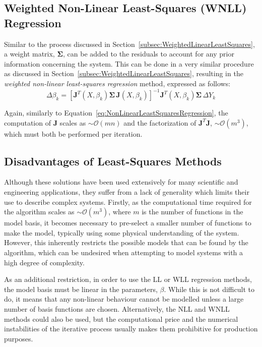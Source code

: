 \documentclass{article}
\begin{document}
\subsection{Weighted Non-Linear Least-Squares (WNLL) Regression}
\label{subsec:WeightedNonLinearLeastSquares}

Similar to the process discussed in Section~\ref{subsec:WeightedLinearLeastSquares}, a weight matrix, $\mathbf{\Sigma}$, can be added to the residuals to account for any prior information concerning the system. This can be done in a very similar procedure as discussed in Section~\ref{subsec:WeightedLinearLeastSquares}, resulting in the \emph{weighted non-linear least-squares regression} method, expressed as follows:
\begin{equation}
\label{eq:WeightedNonLinearLeastSquaresRegression}
	\Delta \beta_k = \left[\mathbf{J}^T\!\left(X,\beta_k\right) \mathbf{\Sigma} \, \mathbf{J}\!\left(X,\beta_k\right)\right]^{-1} \mathbf{J}^T\!\left(X,\beta_k\right) \mathbf{\Sigma} \, \Delta Y_k
\end{equation}

Again, similarly to Equation~\eqref{eq:NonLinearLeastSquaresRegression}, the computation of $\mathbf{J}$ scales as $\sim\mathcal{O}\left(mn\right)$ and the factorization of $\mathbf{J}^T\mathbf{J}$, $\sim\mathcal{O}\left(m^3\right)$, which must both be performed per iteration.

\subsection{Disadvantages of Least-Squares Methods}
\label{eq:LeastSquaresDisadvantages}

Although these solutions have been used extensively for many scientific and engineering applications, they suffer from a lack of generality which limits their use to describe complex systems. Firstly, as the computational time required for the algorithm scales as $\sim\mathcal{O}\!\left(m^3\right)$, where $m$ is the number of functions in the model basis, it becomes necessary to pre-select a smaller number of functions to make the model, typically using some physical understanding of the system. However, this inherently restricts the possible models that can be found by the algorithm, which can be undesired when attempting to model systems with a high degree of complexity.

As an additional restriction, in order to use the LL or WLL regression methods, the model basis must be linear in the parameters, $\beta$. While this is not difficult to do, it means that any non-linear behaviour cannot be modelled unless a large number of basis functions are chosen. Alternatively, the NLL and WNLL methods could also be used, but the computational price and the numerical instabilities of the iterative process usually makes them prohibitive for production purposes.
\end{document}
